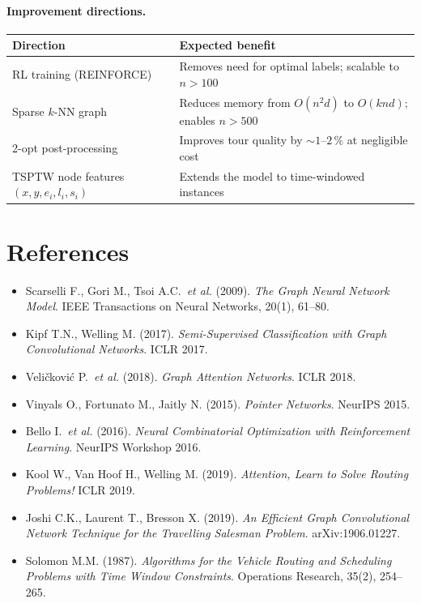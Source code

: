 \documentclass[12pt,a4paper]{article}
\begin{document}
\paragraph{Improvement directions.}

\begin{center}
\begin{tabularx}{\linewidth}{lX}
\toprule
\textbf{Direction} & \textbf{Expected benefit} \\
\midrule
RL training (REINFORCE) & Removes need for optimal labels; scalable to $n > 100$ \\
Sparse $k$-NN graph & Reduces memory from $O(n^2 d)$ to $O(k n d)$;
  enables $n > 500$ \\
2-opt post-processing & Improves tour quality by $\sim 1$--$2\,\%$ at negligible cost \\
TSPTW node features $(x,y,e_i,l_i,s_i)$ & Extends the model to time-windowed instances \\
\bottomrule
\end{tabularx}
\end{center}

\section*{References}

\begin{itemize}[leftmargin=1.5em]
  \item Scarselli F., Gori M., Tsoi A.C.\ \textit{et al.} (2009).
    \textit{The Graph Neural Network Model}.
    IEEE Transactions on Neural Networks, 20(1), 61--80.
  \item Kipf T.N., Welling M. (2017).
    \textit{Semi-Supervised Classification with Graph Convolutional Networks}.
    ICLR 2017.
  \item Veli\v{c}kovi\'{c} P.\ \textit{et al.} (2018).
    \textit{Graph Attention Networks}.
    ICLR 2018.
  \item Vinyals O., Fortunato M., Jaitly N. (2015).
    \textit{Pointer Networks}.
    NeurIPS 2015.
  \item Bello I.\ \textit{et al.} (2016).
    \textit{Neural Combinatorial Optimization with Reinforcement Learning}.
    NeurIPS Workshop 2016.
  \item Kool W., Van Hoof H., Welling M. (2019).
    \textit{Attention, Learn to Solve Routing Problems!}
    ICLR 2019.
  \item Joshi C.K., Laurent T., Bresson X. (2019).
    \textit{An Efficient Graph Convolutional Network Technique for the
    Travelling Salesman Problem}.
    arXiv:1906.01227.
  \item Solomon M.M. (1987).
    \textit{Algorithms for the Vehicle Routing and Scheduling Problems with
    Time Window Constraints}.
    Operations Research, 35(2), 254--265.
\end{itemize}
\end{document}
